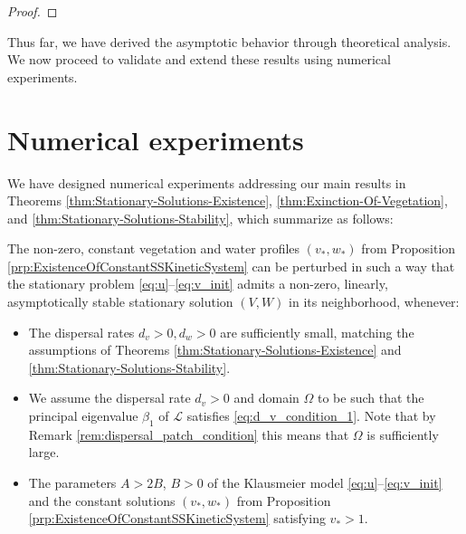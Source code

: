 \documentclass[11pt, a4paper]{article}
\theoremstyle{break}
\theoremstyle{break}
\theoremstyle{break}
\theoremstyle{break}
\theoremstyle{break}
\theoremstyle{break}
\theoremstyle{break}
\theoremstyle{break}
\theoremstyle{break}
\theoremstyle{break}
\begin{document}
\begin{proof}
\end{proof}

Thus far, we have derived the asymptotic behavior through theoretical analysis. We now proceed to validate and extend these results using numerical experiments.

\section{Numerical experiments}
We have designed numerical experiments addressing our main results in Theorems \ref{thm:Stationary-Solutions-Existence}, \ref{thm:Exinction-Of-Vegetation}, and \ref{thm:Stationary-Solutions-Stability}, which summarize as follows: 

The non-zero, constant vegetation and water profiles $(v_*, w_*)$ from Proposition \ref{prp:ExistenceOfConstantSSKineticSystem} can be perturbed in such a way that the stationary problem \eqref{eq:u}--\eqref{eq:v_init} admits a non-zero, linearly, asymptotically stable stationary solution $(V, W)$ in its neighborhood, whenever: 
\begin{itemize}
    \item[(A1)] The dispersal rates $d_v > 0, d_w > 0$ are sufficiently small, matching the assumptions of Theorems \ref{thm:Stationary-Solutions-Existence} and \ref{thm:Stationary-Solutions-Stability}.
    \item[(A2)] We assume the dispersal rate $d_v > 0$ and domain $\Omega$ to be such that the principal eigenvalue $\beta_1$ of $\mathcal{L}$ satisfies \eqref{eq:d_v_condition_1}. Note that by Remark \ref{rem:dispersal_patch_condition} this means that $\Omega$ is sufficiently large.
    \item[(A3)] The parameters $A > 2B$, $B > 0$ of the Klausmeier model \eqref{eq:u}--\eqref{eq:v_init} and the constant solutions $(v_*, w_*)$ from Proposition \ref{prp:ExistenceOfConstantSSKineticSystem} satisfying $v_* > 1$.
\end{itemize}
\end{document}
